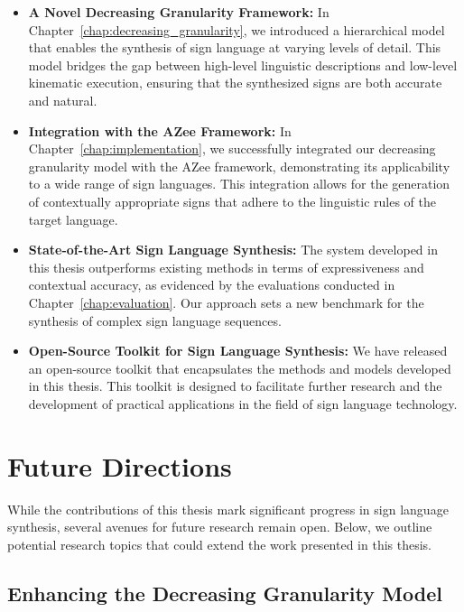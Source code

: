 \documentclass[../../main.tex]{subfiles}
\begin{document}
\begin{itemize}
    \item \textbf{A Novel Decreasing Granularity Framework:} In Chapter~\ref{chap:decreasing_granularity}, we introduced a hierarchical model that enables the synthesis of sign language at varying levels of detail. This model bridges the gap between high-level linguistic descriptions and low-level kinematic execution, ensuring that the synthesized signs are both accurate and natural.

    \item \textbf{Integration with the AZee Framework:} In Chapter~\ref{chap:implementation}, we successfully integrated our decreasing granularity model with the AZee framework, demonstrating its applicability to a wide range of sign languages. This integration allows for the generation of contextually appropriate signs that adhere to the linguistic rules of the target language.

    \item \textbf{State-of-the-Art Sign Language Synthesis:} The system developed in this thesis outperforms existing methods in terms of expressiveness and contextual accuracy, as evidenced by the evaluations conducted in Chapter~\ref{chap:evaluation}. Our approach sets a new benchmark for the synthesis of complex sign language sequences.

    \item \textbf{Open-Source Toolkit for Sign Language Synthesis:} We have released an open-source toolkit that encapsulates the methods and models developed in this thesis. This toolkit is designed to facilitate further research and the development of practical applications in the field of sign language technology.
\end{itemize}

\section{Future Directions}
\label{ch:conclusion:future}

While the contributions of this thesis mark significant progress in sign language synthesis, several avenues for future research remain open. Below, we outline potential research topics that could extend the work presented in this thesis.

\subsection{Enhancing the Decreasing Granularity Model}
\end{document}
